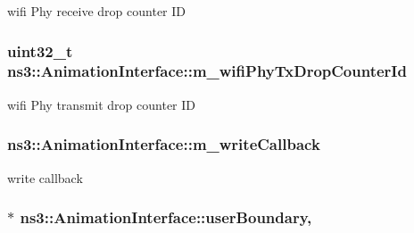 wifi Phy receive drop counter ID 

\subsubsection[{\texorpdfstring{m\+\_\+wifi\+Phy\+Tx\+Drop\+Counter\+Id}{m_wifiPhyTxDropCounterId}}]{\setlength{\rightskip}{0pt plus 5cm}uint32\+\_\+t ns3\+::\+Animation\+Interface\+::m\+\_\+wifi\+Phy\+Tx\+Drop\+Counter\+Id\hspace{0.3cm}{\ttfamily [private]}}\hypertarget{classns3_1_1AnimationInterface_ae2aa7243d535366a66b89cd1742edbed}{}\label{classns3_1_1AnimationInterface_ae2aa7243d535366a66b89cd1742edbed}


wifi Phy transmit drop counter ID 

\subsubsection[{\texorpdfstring{m\+\_\+write\+Callback}{m_writeCallback}}]{ ns3\+::\+Animation\+Interface\+::m\+\_\+write\+Callback\hspace{0.3cm}{\ttfamily [private]}}\hypertarget{classns3_1_1AnimationInterface_aae26d5685c88fd3380d1e501c378a839}{}\label{classns3_1_1AnimationInterface_aae26d5685c88fd3380d1e501c378a839}


write callback 

\subsubsection[{\texorpdfstring{user\+Boundary}{userBoundary}}]{$\ast$ ns3\+::\+Animation\+Interface\+::user\+Boundary\hspace{0.3cm}{\ttfamily [static]}, {\ttfamily [private]}}\hypertarget{classns3_1_1AnimationInterface_a8ca1f63d8c4eadc9cd711b209e7d4002}{}\label{classns3_1_1AnimationInterface_a8ca1f63d8c4eadc9cd711b209e7d4002}


